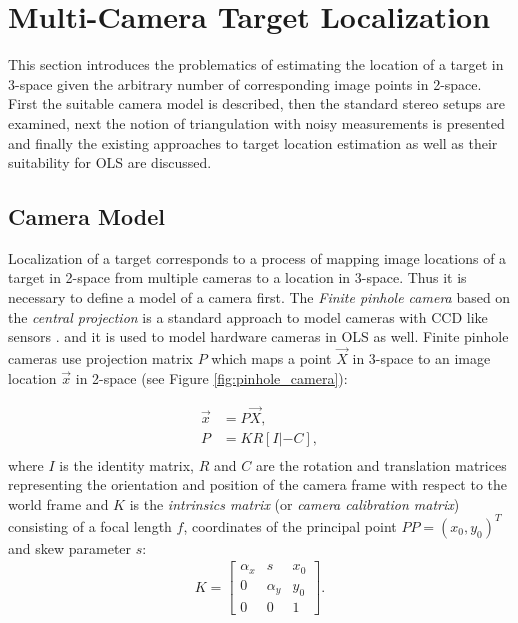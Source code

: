 \section{Multi-Camera Target Localization} \label{txt:multi_camera_target_localization}

This section introduces the problematics of estimating the location of a target in 3-space given the arbitrary number of corresponding image points in 2-space. First the suitable camera model is described, then the standard stereo setups are examined, next the notion of triangulation with noisy measurements is presented and finally the existing approaches to target location estimation as well as their suitability for OLS are discussed.

\subsection{Camera Model}

Localization of a target corresponds to a process of mapping image locations of a target in 2-space from multiple cameras to a location in 3-space. Thus it is necessary to define a model of a camera first. The \textit{Finite pinhole camera} based on the \textit{central projection} is a standard approach to model cameras with CCD like sensors \cite{Hartley:2003:MVG:861369}. and it is used to model hardware cameras in OLS as well. Finite pinhole cameras use projection matrix $P$ which maps a point $\vec{X}$ in 3-space to an image location $\vec{x}$ in 2-space (see Figure \ref{fig:pinhole_camera}):

\begin{align}
	\vec{x} &= P\vec{X},\\
	P &= KR[I|-C],\\
\end{align}
where $I$ is the identity matrix, $R$ and $C$ are the rotation and translation matrices representing the orientation and position of the camera frame with respect to the world frame and $K$ is the \textit{intrinsics matrix} (or \textit{camera calibration matrix}) consisting of a focal length $f$, coordinates of the principal point $PP = (x_{0}, y_{0})^{T}$ and skew parameter $s$:
\begin{align}
	K = \begin{bmatrix}
		\alpha_{x} & s          & x_{0} \\
		0          & \alpha_{y} & y_{0} \\
		0          & 0			& 1
	\end{bmatrix}.
\end{align}

